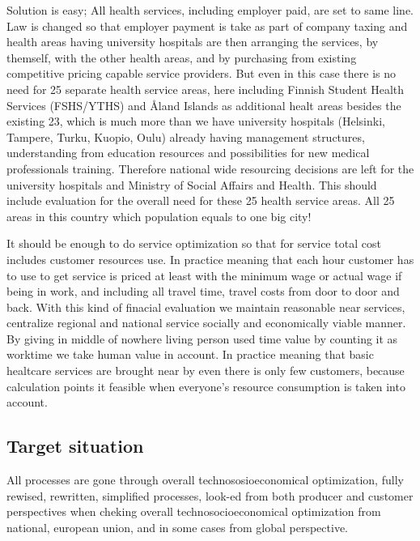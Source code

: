 Solution is easy; All health services, including employer paid, are set to
same line. Law is changed so that employer payment is take as part of company
taxing and health areas having university hospitals are then arranging the
services, by themself, with the other health areas, and by purchasing from
existing competitive pricing capable service providers. But even in this case
there is no need for 25 separate health service areas, here including Finnish
Student Health Services (FSHS/YTHS) and Åland Islands as additional healt
areas besides the existing 23, which is much more than we have university
hospitals (Helsinki, Tampere, Turku, Kuopio, Oulu) already having management
structures, understanding from education resources and possibilities for
new medical professionals training. Therefore national wide resourcing
decisions are left for the university hospitals and Ministry of Social
Affairs and Health. This should include evaluation for the overall need for
these 25 health service areas. All 25 areas in this country which population
equals to one big city!

It should be enough to do service optimization so that for service total cost
includes customer resources use. In practice meaning that each hour customer
has to use to get service is priced at least with the minimum wage or actual
wage if being in work, and including all travel time, travel costs from door
to door and back. With this kind of finacial evaluation we maintain reasonable
near services, centralize regional and national service socially and
economically viable manner. By giving in middle of nowhere living person used
time value by counting it as worktime we take human value in account. In
practice meaning that basic healtcare services are brought near by even there
is only few customers, because calculation points it feasible when everyone's
resource consumption is taken into account.

\subsection{Target situation}
\label{target_situation}

All processes are gone through overall technososioeconomical optimization,
fully rewised, rewritten, simplified processes, look-ed from both producer and
customer perspectives when cheking overall technosocioeconomical optimization
from national, european union, and in some cases from global perspective.

